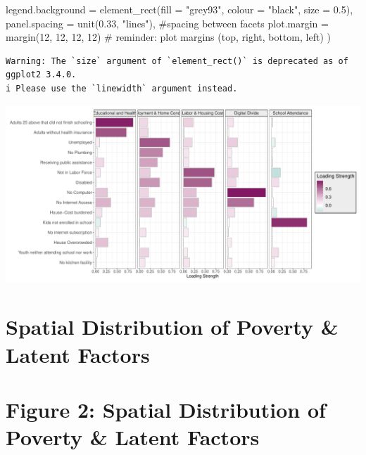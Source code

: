 \documentclass[
  letterpaper,
  DIV=11,
  numbers=noendperiod]{scrreprt}
\newenvironment{Shaded}{\begin{snugshade}}{\end{snugshade}}
\newcommand{\AttributeTok}[1]{\textcolor[rgb]{0.40,0.45,0.13}{#1}}
\newcommand{\CommentTok}[1]{\textcolor[rgb]{0.37,0.37,0.37}{#1}}
\newcommand{\DecValTok}[1]{\textcolor[rgb]{0.68,0.00,0.00}{#1}}
\newcommand{\FloatTok}[1]{\textcolor[rgb]{0.68,0.00,0.00}{#1}}
\newcommand{\FunctionTok}[1]{\textcolor[rgb]{0.28,0.35,0.67}{#1}}
\newcommand{\NormalTok}[1]{\textcolor[rgb]{0.00,0.23,0.31}{#1}}
\newcommand{\StringTok}[1]{\textcolor[rgb]{0.13,0.47,0.30}{#1}}
\begin{document}
\begin{Shaded}
\begin{Highlighting}[]
    \AttributeTok{legend.background =} \FunctionTok{element\_rect}\NormalTok{(}\AttributeTok{fill =} \StringTok{"grey93"}\NormalTok{, }\AttributeTok{colour =} \StringTok{"black"}\NormalTok{, }\AttributeTok{size =} \FloatTok{0.5}\NormalTok{),}
    \AttributeTok{panel.spacing =} \FunctionTok{unit}\NormalTok{(}\FloatTok{0.33}\NormalTok{, }\StringTok{"lines"}\NormalTok{), }\CommentTok{\#spacing between facets}
    \AttributeTok{plot.margin =} \FunctionTok{margin}\NormalTok{(}\DecValTok{12}\NormalTok{, }\DecValTok{12}\NormalTok{, }\DecValTok{12}\NormalTok{, }\DecValTok{12}\NormalTok{) }\CommentTok{\# reminder: plot margins (top, right, bottom, left)}
\NormalTok{  )}
\end{Highlighting}
\end{Shaded}

\begin{verbatim}
Warning: The `size` argument of `element_rect()` is deprecated as of ggplot2 3.4.0.
i Please use the `linewidth` argument instead.
\end{verbatim}

\includegraphics{multidimensional_poverty_files/figure-pdf/viz1-1.pdf}


\chapter{Spatial Distribution of Poverty \& Latent
Factors}\label{spatial-distribution-of-poverty-latent-factors}


\chapter{Figure 2: Spatial Distribution of Poverty \& Latent
Factors}\label{figure-2-spatial-distribution-of-poverty-latent-factors}
\end{document}
